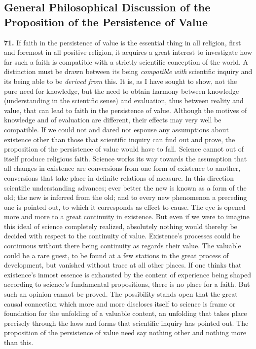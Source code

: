 \documentclass[12pt,a4paper]{book}
\newcommand{\opage}[1]{\marginnote{\footnotesize\textit{[#1]}}}
\begin{document}
\subsection{General Philosophical Discussion of the Proposition
  of the Persistence of Value}
\label{ssec:value-philosophical}

\noindent\textbf{71.} If faith in the persistence of value is the essential thing in all
religion, first and foremost in all positive religion, it acquires a great interest to
investigate how far such a faith is compatible with a strictly scientific conception of the
world. A distinction must be drawn between its being \emph{compatible with} scientific inquiry
and its being able to be \emph{derived from} this. It is, as I have sought to show, not the pure
need for knowledge, but the need to obtain harmony between knowledge (understanding in the
scientific sense) and evaluation, thus between reality and value, that can lead to faith in the
persistence of value. Although the motives of knowledge and of evaluation are different, their
effects may very well be compatible. If we could not and dared not espouse any assumptions about
existence other than those that scientific inquiry can find out and prove, the proposition of the
persistence of value would have to fall. Science cannot out of itself produce religious faith.
Science works its way towards the assumption that all changes in existence are conversions from
one form of existence to another, conversions that take place in definite relations of measure.
In this 
\opage{166}direction scientific understanding advances; ever better the new is known as a form of
the old; the new is inferred from the old; and to every new phenomenon a preceding one is pointed
out, to which it corresponds as effect to cause. The eye is opened more and more to a great
continuity in existence. But even if we were to imagine this ideal of science completely realized,
absolutely nothing would thereby be decided with respect to the continuity of value. Existence's
processes could be continuous without there being continuity as regards their value. The valuable
could be a rare guest, to be found at a few stations in the great process of development, but
vanished without trace at all other places. If one thinks that existence's inmost essence is
exhausted by the content of experience being shaped according to science's fundamental
propositions, there is no place for a faith. But such an opinion cannot be proved. The possibility
stands open that the great causal connection which more and more discloses itself to science is
frame or foundation for the unfolding of a valuable content, an unfolding that takes place
precisely through the laws and forms that scientific inquiry has pointed out. The proposition of
the persistence of value need say nothing other and nothing more than this.
\end{document}
